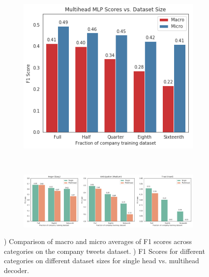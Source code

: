 \documentclass[letterpaper]{article} %
\begin{document}
\begin{figure}[htpb!]
    \centering
    \begin{subfigure}[t]{0.263\textwidth}
        \centering
        \caption{\label{fig:macro-micro}}
        \includegraphics[width=\textwidth]{macro-micro.png}
    \end{subfigure}
    ~ 
    \begin{subfigure}[t]{0.717\textwidth}
        \centering
        \caption{\label{fig:cat-sizes}}
        \includegraphics[width=\textwidth]{cat-sizes2.png}
    \end{subfigure}%
    \caption{) Comparison of macro and micro averages of F1 scores across categories on the company tweets dataset. ) F1 Scores for different categories on different dataset sizes for single head vs. multihead decoder.}
    \label{fig:data-fractions}
\end{figure}
\end{document}
